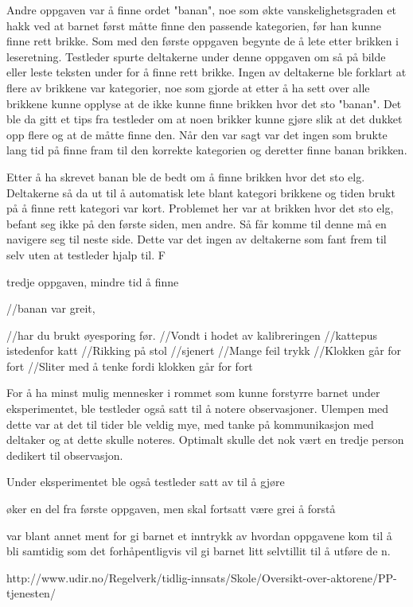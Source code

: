 Andre oppgaven var å finne ordet "banan", noe som økte vanskelighetsgraden et hakk ved at barnet først måtte finne den passende kategorien, før han kunne finne rett brikke. Som med den første oppgaven begynte de å lete etter brikken i leseretning. Testleder spurte deltakerne under denne oppgaven om så på bilde eller leste teksten under for å finne rett brikke. Ingen av deltakerne ble forklart at flere av brikkene var kategorier, noe som gjorde at etter å ha sett over alle brikkene kunne opplyse at de ikke kunne finne brikken hvor det sto "banan".
Det ble da gitt et tips fra testleder om at noen brikker kunne gjøre slik at det dukket opp flere og at de måtte finne den. Når den var sagt var det ingen som brukte lang tid på finne fram til den korrekte kategorien og deretter finne banan brikken. 

Etter å ha skrevet banan ble de bedt om å finne brikken hvor det sto elg. Deltakerne så da ut til å automatisk lete blant kategori brikkene og tiden brukt på å finne rett kategori var kort. Problemet her var at brikken hvor det sto elg, befant seg ikke på den første siden, men andre. Så får komme til denne må en navigere seg til neste side. Dette var det ingen av deltakerne som fant frem til selv uten at testleder hjalp til. F

tredje oppgaven, mindre tid å finne






//banan var greit,





//har du brukt øyesporing før.
//Vondt i hodet av kalibreringen
//kattepus istedenfor katt 
//Rikking på stol
//sjenert
//Mange feil trykk
//Klokken går for fort
//Sliter med å tenke fordi klokken går for fort

For å ha minst mulig mennesker i rommet som kunne forstyrre barnet under eksperimentet, ble testleder også satt til å notere observasjoner. Ulempen med dette var at det til tider ble veldig mye, med tanke på kommunikasjon med deltaker og at dette skulle noteres. Optimalt skulle det nok vært en tredje person dedikert til observasjon.




Under eksperimentet ble også testleder satt av til å gjøre 









øker en del fra første oppgaven, men skal fortsatt være grei å forstå

var blant annet ment for gi barnet et inntrykk av hvordan oppgavene kom til å bli samtidig som det forhåpentligvis vil gi barnet litt selvtillit til å utføre de n. 






http://www.udir.no/Regelverk/tidlig-innsats/Skole/Oversikt-over-aktorene/PP-tjenesten/ 